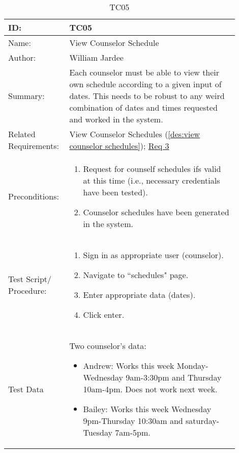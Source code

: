 \documentclass[11pt]{article}
\begin{document}
\begin{table}[H]
\begin{center}
\caption{TC05}
\label{TC05}
\begin{tabular}{p{0.20\linewidth}p{0.70\linewidth}}
	ID: & TC05\\\hline
	Name: & View Counselor Schedule \\\hline
	Author: & William Jardee\\\hline
	Summary: & Each counselor must be able to view their own schedule according to a given input of dates. This needs to be robust to any weird combination of dates and times requested and worked in the system. \\\hline
	Related \hspace{5em} Requirements:& View Counselor Schedules (\cref{des:view counselor schedules}); \hyperlink{Req3}{Req 3}\\\hline
	Preconditions:& \begin{enumerate}[topsep=0pt]
		\item Request for counself schedules ifs valid at this time (i.e., necessary credentials have been tested).
		\item Counselor schedules have been generated in the system. 
	\end{enumerate}\\\hline
	Test Script/ Procedure: & \begin{enumerate}[topsep=0pt]
		\item Sign in as appropriate user (counselor).
		\item Navigate to ``schedules" page.
		\item Enter appropriate data (dates).
		\item Click enter.
	\end{enumerate}\\\hline
	Test Data & \vspace*{.25em} Two counselor's data:
	\begin{itemize}[topsep=0pt]
		\item Andrew: Works this week Monday-Wednesday 9am-3:30pm and Thursday 10am-4pm. Does not work next week.
		\item Bailey: Works this week Wednesday 9pm-Thursday 10:30am and saturday-Tuesday 7am-5pm.
	\end{itemize}
\end{tabular}
\end{center}
\end{table}
\end{document}
